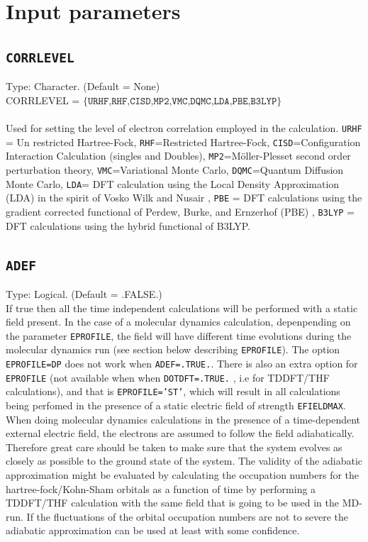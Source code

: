 \documentclass[a4paper,twoside,openany]{book}
\begin{document}
\section{Input parameters}

\subsection{\texttt{CORRLEVEL}}
Type: Character. (Default = None)\\
CORRLEVEL = $\{\texttt{URHF,RHF,CISD,MP2,VMC,DQMC,LDA,PBE,B3LYP}\}$ \\ \\
Used for setting the level of electron correlation employed  in the calculation.  \texttt{URHF} = Un restricted Hartree-Fock, \texttt{RHF}=Restricted Hartree-Fock,
\texttt{CISD}=Configuration Interaction Calculation (singles and Doubles), \texttt{MP2}=M\"oller-Plesset second order perturbation theory, \texttt{VMC}=Variational Monte Carlo,
 \texttt{DQMC}=Quantum Diffusion Monte Carlo, \texttt{LDA}= DFT calculation using the Local Density Approximation (LDA) in the spirit of Vosko Wilk and Nusair \cite{VWN},  \texttt{PBE} = DFT calculations using the gradient corrected 
 functional of Perdew, Burke, and Ernzerhof (PBE) \cite{PBE},   \texttt{B3LYP} = DFT \cite{VWN,LYP,BECKE88,B3LYP} calculations using the hybrid functional of B3LYP.
 
 
  \subsection{\texttt{ADEF}}
Type: Logical. (Default = .FALSE.)\\
If true then all the time independent calculations will be performed with a static field present. In the case of a molecular dynamics calculation, depenpending on 
the parameter \texttt{EPROFILE},  the field will have different time evolutions during the  molecular dynamics run (see section below describing \texttt{EPROFILE}). The option \texttt{EPROFILE=DP} does not work when \texttt{ADEF=.TRUE.}. There is also
an extra option for \texttt{EPROFILE} (not available when when \texttt{DOTDFT=.TRUE.} , i.e for TDDFT/THF calculations), and that is \texttt{EPROFILE='ST'}, which will result in all calculations being perfomed in the presence of a static electric 
field of strength \texttt{EFIELDMAX}. \\ 

When doing molecular dynamics calculations in the presence of a time-dependent external electric field, the electrons are assumed to follow the field adiabatically. Therefore great care should 
be taken to make sure that the system evolves as closely as possible to the ground state of the system. The validity of the adiabatic approximation might be evaluated by calculating the occupation numbers for the hartree-fock/Kohn-Sham orbitals
as a function of time by performing a TDDFT/THF calculation with the same field that is going to be used in the MD-run. If the fluctuations of the orbital occupation numbers are not to severe the adiabatic approximation can be used at least 
with some confidence.
 
\end{document}
